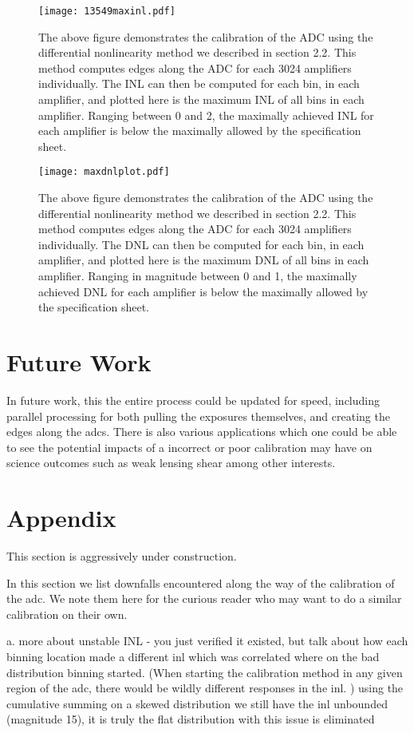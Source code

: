 \documentclass[11pt, letterpaper]{article}
\begin{document}
\begin{figure}
	\texttt{[image: 13549maxinl.pdf]}
	\caption{The above figure demonstrates the calibration of the ADC using the differential nonlinearity method we described in section 2.2. This method computes edges along the ADC for each 3024 amplifiers individually. The INL can then be computed for each bin, in each amplifier, and plotted here is the maximum INL of all bins in each amplifier. Ranging between 0 and 2, the maximally achieved INL for each amplifier is below the maximally allowed by the specification sheet.}
\end{figure}

\begin{figure}
	\texttt{[image: maxdnlplot.pdf]}
	\caption{The above figure demonstrates the calibration of the ADC using the differential nonlinearity method we described in section 2.2. This method computes edges along the ADC for each 3024 amplifiers individually. The DNL can then be computed for each bin, in each amplifier, and plotted here is the maximum DNL of all bins in each amplifier. Ranging in magnitude between 0 and 1, the maximally achieved DNL for each amplifier is below the maximally allowed by the specification sheet. }
\end{figure}

\section{Future Work}
\indent


In future work, this the entire process could be updated for speed, including parallel processing for both pulling the exposures themselves, and creating the edges along the adcs. 
There is also various applications which one could be able to see the potential impacts of a incorrect or poor calibration may have on science outcomes such as weak lensing shear among other interests. 

\section{Appendix}
This section is aggressively under construction. 

In this section we list downfalls encountered along the way of the calibration of the adc. We note them here for the curious reader who may want to do a similar calibration on their own. 

a. more about unstable INL - you just verified it existed, but talk about how each binning location made a different inl which was correlated where on the bad distribution binning started. (When starting the calibration method in any given region of the adc, there would be wildly different responses in the inl. ) using the cumulative summing on a skewed distribution we still have the inl unbounded (magnitude 15), it is truly the flat distribution with this issue is eliminated 
\end{document}

